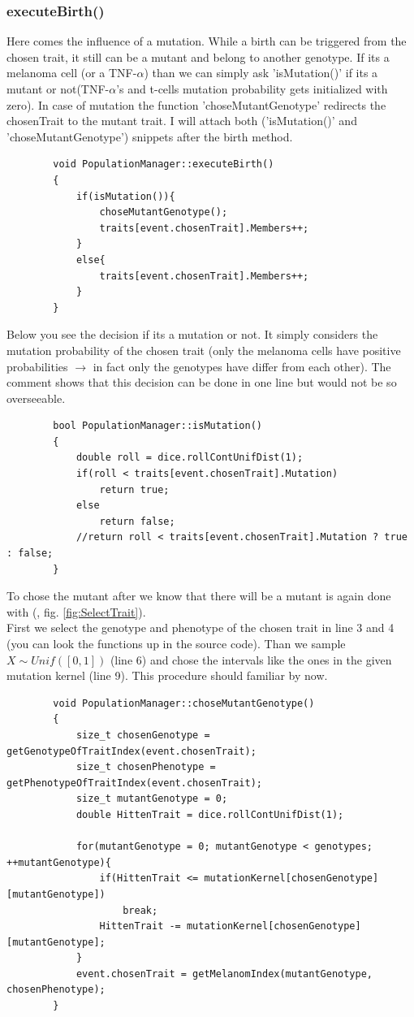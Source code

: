 \documentclass[a4paper,10pt]{scrartcl}
\begin{document}
		\subsubsection{executeBirth()}
		Here comes the influence of a mutation. While a birth can be triggered from the chosen trait, it still can be a mutant and belong to another genotype. 
		If its a melanoma cell (or a TNF-$ \alpha $) than we can simply ask 'isMutation()' if its a mutant or not(TNF-$ \alpha $'s and t-cells mutation probability gets initialized with zero). In case of mutation the function 'choseMutantGenotype' redirects the chosenTrait to the mutant trait. I will attach both ('isMutation()' and 'choseMutantGenotype') snippets after the birth method.
		\begin{lstlisting}
		void PopulationManager::executeBirth()
		{
			if(isMutation()){
		        choseMutantGenotype();
		        traits[event.chosenTrait].Members++;
		    }
			else{
		        traits[event.chosenTrait].Members++;
		    }
		}
		\end{lstlisting}
		Below you see the decision if its a mutation or not. It simply considers the mutation probability of the chosen trait (only the melanoma cells have positive probabilities $ \to $ in fact only the genotypes have differ from each other). The comment shows that this decision can be done in one line but would not be so overseeable.
		\begin{lstlisting}
		bool PopulationManager::isMutation()
		{
		    double roll = dice.rollContUnifDist(1);
		    if(roll < traits[event.chosenTrait].Mutation)
		        return true;
		    else
		        return false;
			//return roll < traits[event.chosenTrait].Mutation ? true : false;		        
		}
		\end{lstlisting}
		To chose the mutant after we know that there will be a mutant is again done with (, fig. \ref{fig:SelectTrait}).\\
		First we select the genotype and phenotype of the chosen trait in line 3 and 4 (you can look the functions up in the source code). Than we sample $ X \sim Unif([0,1]) $ (line 6) and chose the intervals like the ones in the given mutation kernel (line 9). This procedure should familiar by now.
		\begin{lstlisting}
		void PopulationManager::choseMutantGenotype()
		{
		    size_t chosenGenotype = getGenotypeOfTraitIndex(event.chosenTrait);
		    size_t chosenPhenotype = getPhenotypeOfTraitIndex(event.chosenTrait);
		    size_t mutantGenotype = 0;
		    double HittenTrait = dice.rollContUnifDist(1);
		
		    for(mutantGenotype = 0; mutantGenotype < genotypes; ++mutantGenotype){
		        if(HittenTrait <= mutationKernel[chosenGenotype][mutantGenotype])
		            break;
		        HittenTrait -= mutationKernel[chosenGenotype][mutantGenotype];
		    }
		    event.chosenTrait = getMelanomIndex(mutantGenotype, chosenPhenotype); 
		}
		\end{lstlisting}
		
\end{document}
